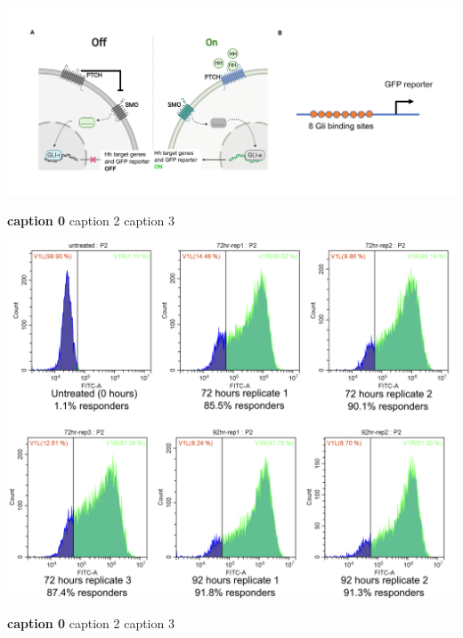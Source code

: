 \begin{suppfigure}[p]  
    \centering
    \includegraphics[width=\linewidth]{figures/hedgehog/SuppFigure1.png}
    \caption[caption1]{
        \textbf{caption 0}
        caption 2
        caption 3   
    }
    \label{fig:hh_figureS1}
\end{suppfigure}


\begin{suppfigure}[p]  
    \centering
    \includegraphics[width=\linewidth]{figures/hedgehog/SuppFigure2.png}
    \caption[caption1]{
        \textbf{caption 0}
        caption 2
        caption 3   
    }
    \label{fig:hh_figureS2}
\end{suppfigure}



